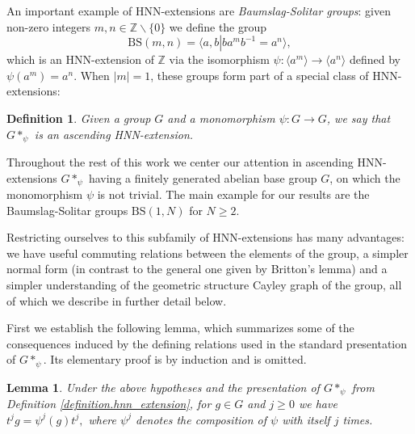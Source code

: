 \documentclass[cupthm,crop,info]{CUP-JNL-ETS}%
\theoremstyle{cupplain}
\newtheorem{lemma}[theorem]{Lemma}
\theoremstyle{cupdefinition}
\newtheorem{definition}{Definition}[section]
\theoremstyle{cupremark}
\theoremstyle{cupproof}
\numberwithin{equation}{section}
\begin{document}
An important example of HNN-extensions are \textit{Baumslag-Solitar groups}: given non-zero integers $m,n\in \mathbb{Z}\backslash\{0\}$ we define the group 
$$\mathrm{BS}(m,n)=\langle a,b \left|\right. ba^mb^{-1}=a^n\rangle,$$ 
which is an HNN-extension of $\mathbb{Z}$ via the isomorphism $\psi:\langle a^m \rangle\to \langle a^n\rangle$ defined by $\psi(a^m)=a^n$. When $|m|=1$, these groups form part of a special class of HNN-extensions:
\begin{definition}\label{def:ascending hnn extension} Given a group $G$ and a monomorphism $\psi:G\to G$, we say that $G*_{\psi}$ is an \textit{ascending HNN-extension}.
\end{definition}

Throughout the rest of this work we center our attention in ascending HNN-extensions $G*_{\psi}$ having a finitely generated abelian base group $G$, on which the monomorphism $\psi$ is not trivial. The main example for our results are the Baumslag-Solitar groups $\mathrm{BS}(1,N)$ for $N\ge 2$.

Restricting ourselves to this subfamily of HNN-extensions has many advantages: we have useful commuting relations between the elements of the group, a simpler normal form (in contrast to the general one given by Britton's lemma) and a simpler understanding of the geometric structure Cayley graph of the group, all of which we describe in further detail below.

First we establish the following lemma, which summarizes some of the consequences induced by the defining relations used in the standard presentation of $G*_{\psi}$. Its elementary proof is by induction and is omitted.

\begin{lemma}\label{lemma:ascending_hnn_further_identifications}
	Under the above hypotheses and the presentation of $G*_{\psi}$ from Definition \ref{definition.hnn_extension}, for $g\in G$ and $j\ge 0$ we have $	t^jg=\psi^j(g)t^j,$ where $\psi^j$ denotes the composition of $\psi$ with itself $j$ times.
\end{lemma}
\end{document}
